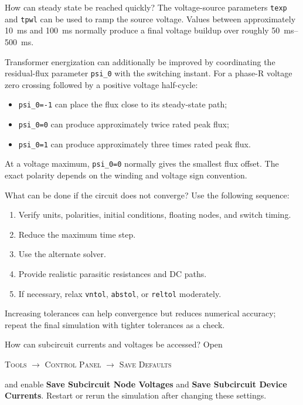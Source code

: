 \begin{formulaBox}{How can steady state be reached quickly?}
The voltage-source parameters \texttt{texp} and \texttt{tpwl} can be used to
ramp the source voltage. Values between approximately
\SI{10}{\milli\second} and \SI{100}{\milli\second} normally produce a final
voltage buildup over roughly \SIrange{50}{500}{\milli\second}.

Transformer energization can additionally be improved by coordinating the
residual-flux parameter \texttt{psi\_0} with the switching instant. For a
phase-R voltage zero crossing followed by a positive voltage half-cycle:
\begin{itemize}
\item \texttt{psi\_0=-1} can place the flux close to its steady-state path;
\item \texttt{psi\_0=0} can produce approximately twice rated peak flux;
\item \texttt{psi\_0=1} can produce approximately three times rated peak flux.
\end{itemize}
At a voltage maximum, \texttt{psi\_0=0} normally gives the smallest flux
offset. The exact polarity depends on the winding and voltage sign convention.
\end{formulaBox}

\begin{formulaBox}{What can be done if the circuit does not converge?}
Use the following sequence:
\begin{enumerate}
\item Verify units, polarities, initial conditions, floating nodes, and switch
      timing.
\item Reduce the maximum time step.
\item Use the alternate solver.
\item Provide realistic parasitic resistances and DC paths.
\item If necessary, relax \texttt{vntol}, \texttt{abstol}, or
      \texttt{reltol} moderately.
\end{enumerate}
Increasing tolerances can help convergence but reduces numerical accuracy;
repeat the final simulation with tighter tolerances as a check.
\end{formulaBox}

\begin{formulaBox}{How can subcircuit currents and voltages be accessed?}
Open
\begin{center}
\textsc{Tools} $\rightarrow$ \textsc{Control Panel} $\rightarrow$
\textsc{Save Defaults}
\end{center}
and enable \textbf{Save Subcircuit Node Voltages} and
\textbf{Save Subcircuit Device Currents}. Restart or rerun the simulation after
changing these settings.
\end{formulaBox}

